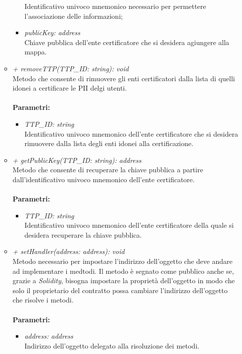 \begin{itemize}
\begin{itemize}
\begin{itemize}
			Identificativo univoco mnemonico necessario per permettere l'associazione delle informazioni;
			\item \textit{publicKey: address}\\
			Chiave pubblica dell'ente certificatore che si desidera agiungere alla mappa.
		\end{itemize}
		\item \textit{+ removeTTP(TTP\_ID: string): void}\\
		Metodo che consente di rimuovere gli enti certificatori dalla lista di quelli idonei a certificare le \gls{PII} delgi utenti.\\\\
		\textbf{Parametri:}
		\begin{itemize}
			\item \textit{TTP\_ID: string}\\
			Identificativo univoco mnemonico dell'ente certificatore che si desidera rimuovere dalla lista degli enti idonei alla certificazione.
		\end{itemize}
		\item \textit{+ getPublicKey(TTP\_ID: string): address}\\
		Metodo che consente di recuperare la chiave pubblica a partire dall'identificativo univoco mnemonico dell'ente certificatore.\\\\
		\textbf{Parametri:}
		\begin{itemize}
			\item \textit{TTP\_ID: string}\\
			Identificativo univoco mnemonico dell'ente certificatore della quale si desidera recuperare la chiave pubblica.
		\end{itemize}
		\item \textit{+ setHandler(address: address): void}\\
		Metodo necessario per impostare l'indirizzo dell'oggetto che deve andare ad implementare i medtodi. Il metodo è segnato come pubblico anche se, grazie a \textit{Solidity}, bisogna impostare la proprietà dell'oggetto in modo che solo il proprietario del contratto possa cambiare l'indirizzo dell'oggetto che risolve i metodi.\\\\
		\textbf{Parametri:}
		\begin{itemize}
			\item \textit{address: address}\\
			Indirizzo dell'oggetto delegato alla risoluzione dei metodi.
		\end{itemize}
	\end{itemize}
\end{itemize}
\newpage
